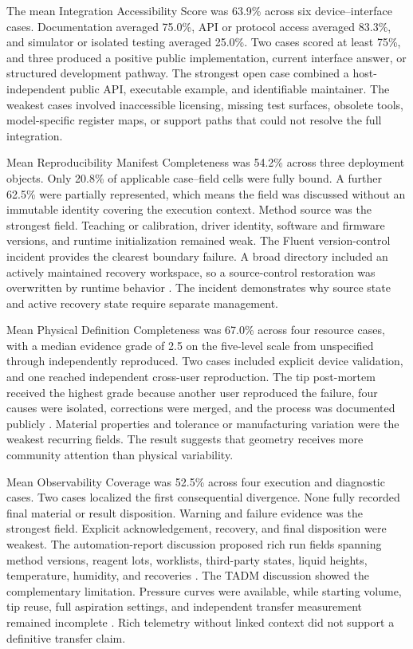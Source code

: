 The mean Integration Accessibility Score was 63.9\% across six device--interface cases. Documentation averaged 75.0\%, API or protocol access averaged 83.3\%, and simulator or isolated testing averaged 25.0\%. Two cases scored at least 75\%, and three produced a positive public implementation, current interface answer, or structured development pathway. The strongest open case combined a host-independent public API, executable example, and identifiable maintainer. The weakest cases involved inaccessible licensing, missing test surfaces, obsolete tools, model-specific register maps, or support paths that could not resolve the full integration.

Mean Reproducibility Manifest Completeness was 54.2\% across three deployment objects. Only 20.8\% of applicable case--field cells were fully bound. A further 62.5\% were partially represented, which means the field was discussed without an immutable identity covering the execution context. Method source was the strongest field. Teaching or calibration, driver identity, software and firmware versions, and runtime initialization remained weak. The Fluent version-control incident provides the clearest boundary failure. A broad directory included an actively maintained recovery workspace, so a source-control restoration was overwritten by runtime behavior \cite{forum_tecan_git}. The incident demonstrates why source state and active recovery state require separate management.

Mean Physical Definition Completeness was 67.0\% across four resource cases, with a median evidence grade of 2.5 on the five-level scale from unspecified through independently reproduced. Two cases included explicit device validation, and one reached independent cross-user reproduction. The tip post-mortem received the highest grade because another user reproduced the failure, four causes were isolated, corrections were merged, and the process was documented publicly \cite{forum_tip_postmortem}. Material properties and tolerance or manufacturing variation were the weakest recurring fields. The result suggests that geometry receives more community attention than physical variability.

Mean Observability Coverage was 52.5\% across four execution and diagnostic cases. Two cases localized the first consequential divergence. None fully recorded final material or result disposition. Warning and failure evidence was the strongest field. Explicit acknowledgement, recovery, and final disposition were weakest. The automation-report discussion proposed rich run fields spanning method versions, reagent lots, worklists, third-party states, liquid heights, temperature, humidity, and recoveries \cite{forum_automation_report}. The TADM discussion showed the complementary limitation. Pressure curves were available, while starting volume, tip reuse, full aspiration settings, and independent transfer measurement remained incomplete \cite{forum_tadm}. Rich telemetry without linked context did not support a definitive transfer claim.

